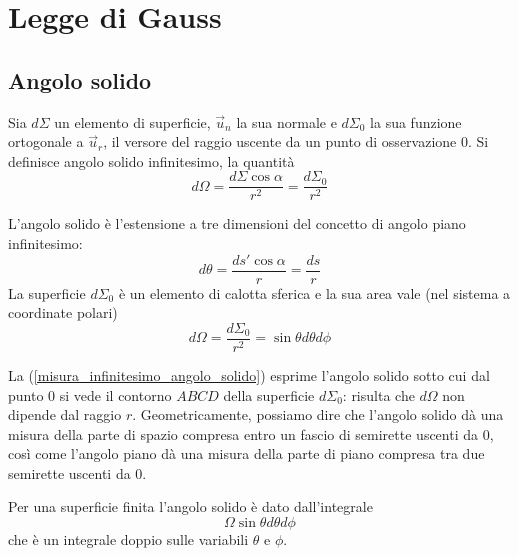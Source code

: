 \documentclass[class=book, crop=false, oneside, 12pt]{standalone}
\begin{document}
\chapter{Legge di Gauss}

\section{Angolo solido}

Sia \(d \Sigma\) un elemento di superficie, \(\overrightarrow{u}_n\) la sua normale e \(d \Sigma_0\) la sua funzione ortogonale a \(\overrightarrow{u}_r\), il versore del raggio uscente da un punto di osservazione \(0\). 
Si definisce angolo solido infinitesimo, la quantità
\begin{equation}
    d \Omega = \frac{d \Sigma \cos \alpha}{r^2} = \frac{d \Sigma_0}{r^2}
\end{equation}

L'angolo solido è l'estensione a tre dimensioni del concetto di angolo piano infinitesimo:
\begin{equation}
    d \theta = \frac{ds' \cos \alpha}{r} = \frac{ds}{r}
\end{equation}
La superficie \(d \Sigma_0\) è un elemento di calotta sferica e la sua area vale (nel sistema a coordinate polari)
\begin{equation} \label{misura_infinitesimo_angolo_solido}
    d \Omega = \frac{d \Sigma_0}{r^2} = \sin \theta d \theta d \phi
\end{equation}

La (\ref{misura_infinitesimo_angolo_solido}) esprime l'angolo solido sotto cui dal punto \(0\) si vede il contorno \(ABCD\) della superficie \(d \Sigma_0\): 
risulta che \(d \Omega\) non dipende dal raggio \(r\). 
Geometricamente, possiamo dire che l'angolo solido dà una misura della parte di spazio compresa entro un fascio di semirette uscenti da \(0\), così come l'angolo piano dà una misura della parte di piano compresa tra due semirette uscenti da \(0\).

Per una superficie finita l'angolo solido è dato dall'integrale
\begin{equation}
    \Omega \sin \theta d \theta d \phi
\end{equation}
che è un integrale doppio sulle variabili \(\theta\) e \(\phi\).
\end{document}
